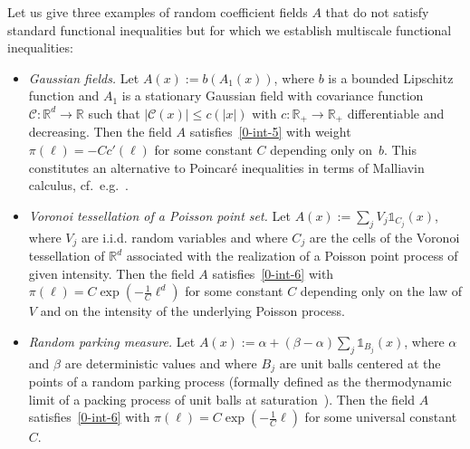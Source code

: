 \documentclass[10pt]{amsart}
\theoremstyle{definition}\newtheorem{defi}[theo]{Definition}\newtheorem{rema}[theo]{Remark}\newtheorem{exam}[theo]{Example}\newtheorem{exem}[theo]{Example}\newtheorem{nota}[theo]{Notation}
\newcommand{\R}{\mathbb R}
\begin{document}
Let us give three examples of random coefficient fields $A$ that do not satisfy standard functional inequalities but for which we establish multiscale functional inequalities:
\begin{itemize}
\item \emph{Gaussian fields.} Let $A(x):=b(A_1(x))$, where $b$ is a bounded Lipschitz function and $A_1$ is a stationary Gaussian field with covariance function $\mathcal C:\R^d \to \R$ such that $|\mathcal C(x)|\le c(|x|)$ with $c:\R_+\to \R_+$ differentiable and decreasing. Then the field $A$ satisfies~\eqref{0-int-5} with weight $\pi(\ell)=-C c'(\ell)$ for some constant $C$ depending only on~$b$. This constitutes an alternative to Poincaré inequalities in terms of Malliavin calculus, cf.~e.g.~\cite{Houdre-PerezAbreu-95,Nourdin-Peccati-12}.
\item \emph{Voronoi tessellation of a Poisson point set.} Let $A(x):=\sum_jV_j \mathds1_{C_j}(x)$, where $V_j$ are i.i.d. random variables and where $C_j$ are the cells of the Voronoi tessellation of $\R^d$ associated with the realization of a Poisson point process of given intensity. Then the field $A$ satisfies~\eqref{0-int-6} with $\pi(\ell)=C \exp(-\frac1C \ell^d)$ for some constant $C$ depending only on the law of $V$ and on the intensity of the underlying Poisson process.
\item \emph{Random parking measure.} Let $A(x):=\alpha+(\beta-\alpha)\sum_j \mathds1_{B_j}(x)$, where $\alpha$ and $\beta$ are deterministic values and where $B_j$ are unit balls centered at the points of a random parking process (formally defined as the thermodynamic limit of a packing process of unit balls at saturation~\cite{Penrose-01}). Then the field $A$ satisfies~\eqref{0-int-6} with $\pi(\ell)= C\exp(-\frac1C \ell)$ for some universal constant $C$.
\end{itemize}
\end{document}
